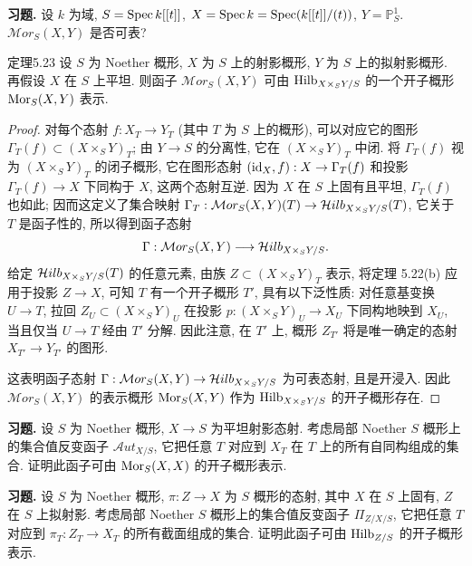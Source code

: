 \textbf{习题.} 设 $k$ 为域, $S=\operatorname{Spec} k[[t]]$, $X=\operatorname{Spec} k=\operatorname{Spec}(k[[t]]/(t))$, $Y=\mathbb P^1_S$. $\mathcal{M}or_S(X,Y)$ 是否可表?

\begin{origstatement}{定理}{5.23}\label{ch05:thm5.23}
设 $S$ 为 Noether 概形, $X$ 为 $S$ 上的射影概形, $Y$ 为 $S$ 上的拟射影概形. 再假设 $X$ 在 $S$ 上平坦. 则函子 $\mathcal{M}or_S(X,Y)$ 可由 $\operatorname{Hilb}_{X\times_S Y/S}$ 的一个开子概形 $\operatorname{Mor}_S(X,Y)$ 表示.
\end{origstatement}
\begin{proof}
对每个态射 $f:X_T\to Y_T$ (其中 $T$ 为 $S$ 上的概形), 可以对应它的图形 $\Gamma_T(f)\subset(X\times_S Y)_T$; 由 $Y\to S$ 的分离性, 它在 $(X\times_S Y)_T$ 中闭. 将 $\Gamma_T(f)$ 视为 $(X\times_S Y)_T$ 的闭子概形, 它在图形态射 $(\mathrm{id}_X,f):X\to\Gamma_T(f)$ 和投影 $\Gamma_T(f)\to X$ 下同构于 $X$, 这两个态射互逆. 因为 $X$ 在 $S$ 上固有且平坦, $\Gamma_T(f)$ 也如此; 因而这定义了集合映射 $\Gamma_T:\mathcal{M}or_S(X,Y)(T)\to\mathcal{H}ilb_{X\times_S Y/S}(T)$, 它关于 $T$ 是函子性的, 所以得到函子态射
\[
 \Gamma:\mathcal{M}or_S(X,Y)\longrightarrow\mathcal{H}ilb_{X\times_S Y/S}.
\]
给定 $\mathcal{H}ilb_{X\times_S Y/S}(T)$ 的任意元素, 由族 $Z\subset(X\times_S Y)_T$ 表示, 将定理 5.22(b) 应用于投影 $Z\to X$, 可知 $T$ 有一个开子概形 $T'$, 具有以下泛性质: 对任意基变换 $U\to T$, 拉回 $Z_U\subset(X\times_S Y)_U$ 在投影 $p:(X\times_S Y)_U\to X_U$ 下同构地映到 $X_U$, 当且仅当 $U\to T$ 经由 $T'$ 分解. 因此注意, 在 $T'$ 上, 概形 $Z_{T'}$ 将是唯一确定的态射 $X_{T'}\to Y_{T'}$ 的图形.

这表明函子态射 $\Gamma:\mathcal{M}or_S(X,Y)\to\mathcal{H}ilb_{X\times_S Y/S}$ 为可表态射, 且是开浸入. 因此 $\mathcal{M}or_S(X,Y)$ 的表示概形 $\operatorname{Mor}_S(X,Y)$ 作为 $\operatorname{Hilb}_{X\times_S Y/S}$ 的开子概形存在.
\end{proof}

\textbf{习题.} 设 $S$ 为 Noether 概形, $X\to S$ 为平坦射影态射. 考虑局部 Noether $S$ 概形上的集合值反变函子 $\mathcal{A}ut_{X/S}$, 它把任意 $T$ 对应到 $X_T$ 在 $T$ 上的所有自同构组成的集合. 证明此函子可由 $\operatorname{Mor}_S(X,X)$ 的开子概形表示.

\textbf{习题.} 设 $S$ 为 Noether 概形, $\pi:Z\to X$ 为 $S$ 概形的态射, 其中 $X$ 在 $S$ 上固有, $Z$ 在 $S$ 上拟射影. 考虑局部 Noether $S$ 概形上的集合值反变函子 $\Pi_{Z/X/S}$, 它把任意 $T$ 对应到 $\pi_T:Z_T\to X_T$ 的所有截面组成的集合. 证明此函子可由 $\operatorname{Hilb}_{Z/S}$ 的开子概形表示.
